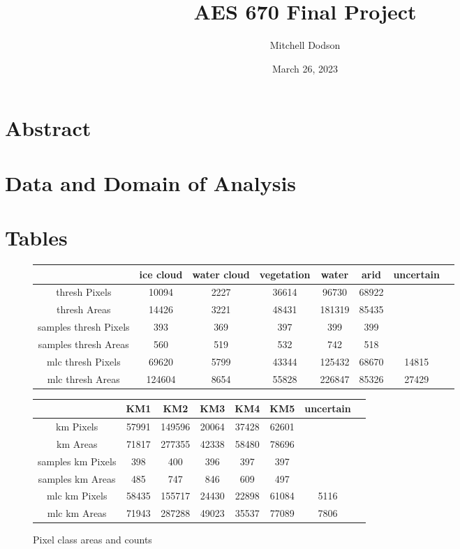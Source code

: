 \documentclass[12pt]{article}
\title{AES 670 Final Project}
\author{Mitchell Dodson}
\date{March 26, 2023}
\begin{document}
\maketitle

\vspace{5em}

\section{Abstract}

\section{Data and Domain of Analysis}

\section{Tables}

\begin{figure}[h!]
\centering
\begin{tabular}{c|ccccccc}
& ice cloud & water cloud & vegetation & water & arid & uncertain\\
\hline
thresh Pixels & 10094 & 2227 & 36614 & 96730 & 68922\\
thresh Areas & 14426 & 3221 & 48431 & 181319 & 85435\\
\hline
samples thresh Pixels & 393 & 369 & 397 & 399 & 399\\
samples thresh Areas & 560 & 519 & 532 & 742 & 518\\
\hline
mlc thresh Pixels & 69620 & 5799 & 43344 & 125432 & 68670 & 14815\\
mlc thresh Areas & 124604 & 8654 & 55828 & 226847 & 85326 & 27429\\
\end{tabular}
\begin{tabular}{c|ccccccc}
& KM1 & KM2 & KM3 & KM4 & KM5 & uncertain\\
\hline
km Pixels & 57991 & 149596 & 20064 & 37428 & 62601\\
km Areas & 71817 & 277355 & 42338 & 58480 & 78696\\
\hline
samples km Pixels & 398 & 400 & 396 & 397 & 397\\
samples km Areas & 485 & 747 & 846 & 609 & 497\\
\hline
mlc km Pixels & 58435 & 155717 & 24430 & 22898 & 61084 & 5116\\
mlc km Areas & 71943 & 287288 & 49023 & 35537 & 77089 & 7806\\
\end{tabular}
\caption{Pixel class areas and counts}
\label{pixel_areas}
\end{figure}
\end{document}
